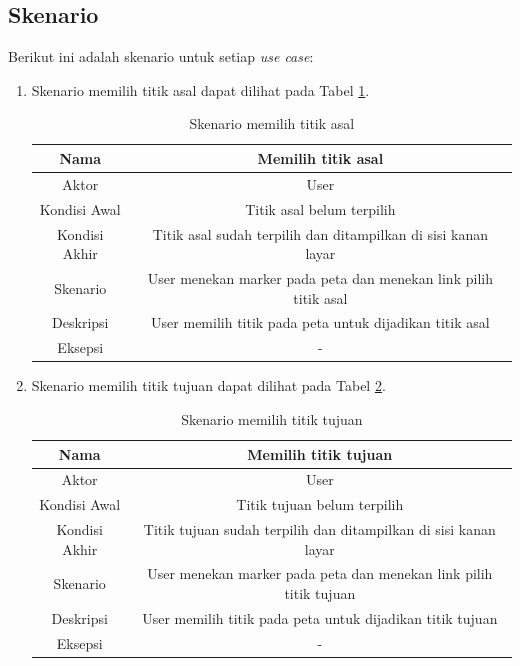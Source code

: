\subsection{Skenario}
Berikut ini adalah skenario untuk setiap \textit{use case}:
\begin{enumerate}
  \item Skenario memilih titik asal dapat dilihat pada Tabel
  \ref{tab:titik_asal}.  
\begin{table}[h]
\caption{Skenario memilih titik asal} 
\label{tab:titik_asal}
\begin{tabular}{|c|c|}
\hline
Nama          & Memilih titik asal                                              \\ \hline
Aktor         & User                                                            \\ \hline
Kondisi Awal  & Titik asal belum terpilih                                       \\ \hline
Kondisi Akhir & Titik asal sudah terpilih dan ditampilkan di sisi kanan layar   \\ \hline
Skenario      & User menekan marker pada peta dan menekan link pilih titik asal \\ \hline
Deskripsi     & User memilih titik pada peta untuk dijadikan titik asal         \\ \hline
Eksepsi       & -                                                               \\ \hline
\end{tabular}
\end{table}

  \item Skenario memilih titik tujuan dapat dilihat pada Tabel
  \ref{tab:titik_tujuan}.
\begin{table}[h]
\caption{Skenario memilih titik tujuan} 
\label{tab:titik_tujuan}
\begin{tabular}{|c|c|}
\hline
Nama          & Memilih titik tujuan                                              \\ \hline
Aktor         & User                                                              \\ \hline
Kondisi Awal  & Titik tujuan belum terpilih                                       \\ \hline
Kondisi Akhir & Titik tujuan sudah terpilih dan ditampilkan di sisi kanan layar   \\ \hline
Skenario      & User menekan marker pada peta dan menekan link pilih titik tujuan \\ \hline
Deskripsi     & User memilih titik pada peta untuk dijadikan titik tujuan         \\ \hline
Eksepsi       & -                                                                 \\ \hline
\end{tabular}
\end{table}


\end{enumerate}
